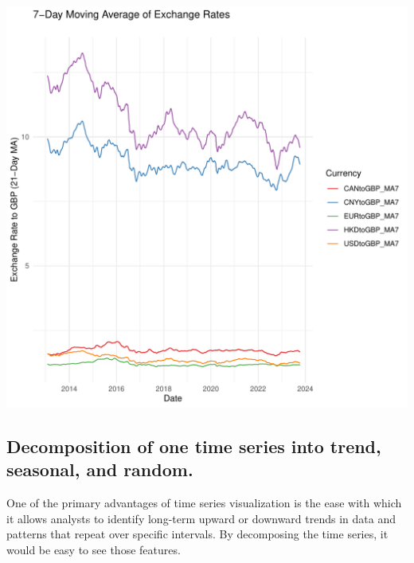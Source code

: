 \documentclass{article}\usepackage[]{graphicx}\usepackage[]{xcolor}
\makeatletter
\def\maxwidth{ %
  \ifdim\Gin@nat@width>\linewidth
    \linewidth
  \else
    \Gin@nat@width
  \fi
}
\newenvironment{kframe}{%
 \def\at@end@of@kframe{}%
 \ifinner\ifhmode%
  \def\at@end@of@kframe{\end{minipage}}%
  \begin{minipage}{\columnwidth}%
 \fi\fi%
 \def\FrameCommand##1{\hskip\@totalleftmargin \hskip-\fboxsep
 \colorbox{shadecolor}{##1}\hskip-\fboxsep
     \hskip-\linewidth \hskip-\@totalleftmargin \hskip\columnwidth}%
 \MakeFramed {\advance\hsize-\width
   \@totalleftmargin\z@ \linewidth\hsize
   \@setminipage}}%
 {\par\unskip\endMakeFramed%
 \at@end@of@kframe}
\newenvironment{knitrout}{}{} %
\makeatother
\begin{document}
\begin{knitrout}
\begin{kframe}
{\ttfamily\noindent\color{warningcolor}{\#\# Warning: Removed 100 rows containing missing values (`geom\_line()`).}}\end{kframe}
\includegraphics[width=\maxwidth]{figure/unnamed-chunk-2-1} 
\end{knitrout}




\subsection{Decomposition of one time series into trend, seasonal, and random.}


One of the primary advantages of time series visualization is the ease with which it allows analysts to identify long-term upward or downward trends in data and patterns that repeat over specific intervals. By decomposing the time series, it would be easy to see those features.
\end{document}
